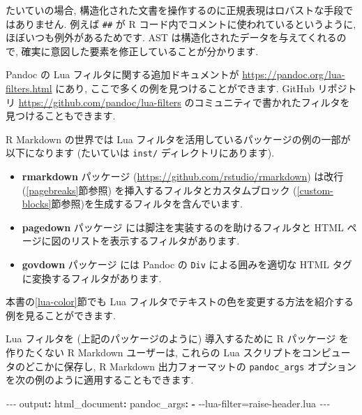 \documentclass[
  11pt,
  lualatex,ja=standard,jafont=noto]{bxjsreport}
\newenvironment{Shaded}{\begin{snugshade}}{\end{snugshade}}
\newcommand{\AttributeTok}[1]{\textcolor[rgb]{0.77,0.63,0.00}{#1}}
\newcommand{\FunctionTok}[1]{\textcolor[rgb]{0.00,0.00,0.00}{#1}}
\newcommand{\KeywordTok}[1]{\textcolor[rgb]{0.13,0.29,0.53}{\textbf{#1}}}
\newcommand{\PreprocessorTok}[1]{\textcolor[rgb]{0.56,0.35,0.01}{\textit{#1}}}
\begin{document}
たいていの場合, 構造化された文書を操作するのに正規表現はロバストな手段ではありません. 例えば \texttt{\#\#} が R コード内でコメントに使われているというように, ほぼいつも例外があるためです. AST は構造化されたデータを与えてくれるので, 確実に意図した要素を修正していることが分かります.

Pandoc の Lua フィルタに関する追加ドキュメントが \url{https://pandoc.org/lua-filters.html} にあり, ここで多くの例を見つけることができます. GitHub リポジトリ \url{https://github.com/pandoc/lua-filters} のコミュニティで書かれたフィルタを見つけることもできます.

R Markdown の世界では Lua フィルタを活用しているパッケージの例の一部が以下になります (たいていは \texttt{inst/} ディレクトリにあります).

\begin{itemize}
\item
  \textbf{rmarkdown} パッケージ (\url{https://github.com/rstudio/rmarkdown}) は改行 (\ref{pagebreaks}節参照) を挿入するフィルタとカスタムブロック (\ref{custom-blocks}節参照)を生成するフィルタを含んでいます.
\item
  \textbf{pagedown} パッケージ \autocite{R-pagedown} には脚注を実装するのを助けるフィルタと HTML ページに図のリストを表示するフィルタがあります.
\item
  \textbf{govdown} パッケージ \autocite{R-govdown} には Pandoc の \texttt{Div} による囲みを適切な HTML タグに変換するフィルタがあります.
\end{itemize}

本書の\ref{lua-color}節でも Lua フィルタでテキストの色を変更する方法を紹介する例を見ることができます.

Lua フィルタを (上記のパッケージのように) 導入するために R パッケージ を作りたくない R Markdown ユーザーは, これらの Lua スクリプトをコンピュータのどこかに保存し, R Markdown 出力フォーマットの \texttt{pandoc\_args} オプションを次の例のように適用することもできます.

\begin{Shaded}
\begin{Highlighting}[]
\PreprocessorTok{{-}{-}{-}}
\FunctionTok{output}\KeywordTok{:}
\AttributeTok{  }\FunctionTok{html\_document}\KeywordTok{:}
\AttributeTok{    }\FunctionTok{pandoc\_args}\KeywordTok{:}
\AttributeTok{      }\KeywordTok{{-}}\AttributeTok{ {-}{-}lua{-}filter=raise{-}header.lua}
\PreprocessorTok{{-}{-}{-}}
\end{Highlighting}
\end{Shaded}
\end{document}
